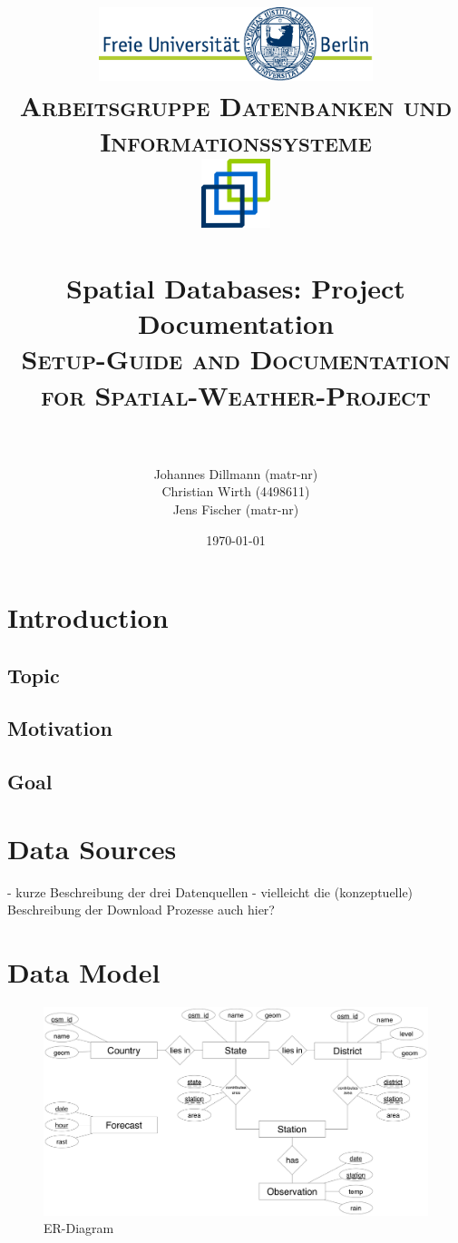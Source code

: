 \documentclass[paper=a4, fontsize=11pt]{scrartcl} %
\title{	
\normalfont \normalsize 
\textsc{\includegraphics[width=0.6\textwidth]{pictures/logo} \\ [5pt] Arbeitsgruppe Datenbanken und Informationssysteme \\ [20pt] \includegraphics[width=0.15\textwidth]{pictures/DBIS_Logo_rgb_web.png}} \\ [10pt] %
\horrule{0.5pt} \\[0.4cm] %
\huge Spatial Databases: Project Documentation \\ %
\normalsize \textsc{Setup-Guide and Documentation for Spatial-Weather-Project} \\ [0.4cm]
\horrule{2pt} \\[0.5cm] %
}
\author{Johannes Dillmann (matr-nr) \\ Christian Wirth (4498611) \\ Jens Fischer (matr-nr)}
\date{\normalsize\today} %
\numberwithin{equation}{section} %
\numberwithin{figure}{section} %
\numberwithin{table}{section} %
\begin{document}
\begin{titlepage}
\maketitle
\thispagestyle{empty}
\end{titlepage}

\newpage
\setcounter{page}{1}
\tableofcontents

\newpage
\listoffigures
{}

\newpage
{}
\pagestyle{fancy}
\setcounter{page}{1}

\section{Introduction}
	\subsection{Topic}
	\subsection{Motivation}
	\subsection{Goal}
\section{Data Sources}
	- kurze Beschreibung der drei Datenquellen
	- vielleicht die (konzeptuelle) Beschreibung der Download Prozesse auch hier?
	
\section{Data Model}
\begin{figure}[htbp]
\includegraphics[width=1\textwidth]{pictures/ER}
\caption{ER-Diagram}
\end{figure}
\end{document}
